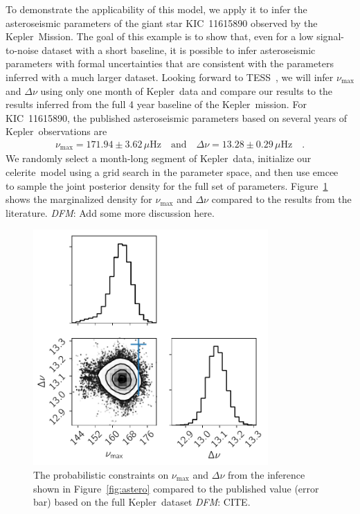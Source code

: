 \documentclass[manuscript, letterpaper]{aastex6}
\newcommand{\project}[1]{\textsf{#1}}
\newcommand{\kepler}{\project{Kepler}}
\newcommand{\tess}{\project{TESS}}
\newcommand{\celerite}{\project{celerite}}
\newcommand{\emcee}{\project{emcee}}
\newcommand{\figureref}[1]{\ref{fig:#1}}
\newcommand{\Figure}[1]{Figure~\figureref{#1}}
\newcommand{\figurelabel}[1]{\label{fig:#1}}
\newcommand{\todo}[3]{{\color{#2}\emph{#1}: #3}}
\newcommand{\dfmtodo}[1]{\todo{DFM}{red}{#1}}
\begin{document}
To demonstrate the applicability of this model, we apply it to infer the
asteroseismic parameters of the giant star KIC~11615890 observed by the
\kepler\ Mission.
The goal of this example is to show that, even for a low signal-to-noise
dataset with a short baseline, it is possible to infer asteroseismic
parameters with formal uncertainties that are consistent with the parameters
inferred with a much larger dataset.
Looking forward to \tess\ \citep{Ricker:2014,Campante:2016}, we will infer
$\nu_\mathrm{max}$ and $\Delta\nu$ using only one month of \kepler\ data and
compare our results to the results inferred from the full 4 year baseline of
the \kepler\ mission.
For KIC~11615890, the published asteroseismic parameters based on several
years of \kepler\ observations are \citep{Pinsonneault:2014}
\begin{eqnarray}
    \nu_\mathrm{max} = 171.94 \pm 3.62 \,\mu\mathrm{Hz} \quad\mathrm{and}\quad
    \Delta\nu = 13.28 \pm 0.29 \,\mu\mathrm{Hz} \quad.
\end{eqnarray}
We randomly select a month-long segment of \kepler\ data, initialize our
\celerite\ model using a grid search in the parameter space, and then use
\emcee\ \citep{Foreman-Mackey:2013} to sample the joint posterior density for
the full set of parameters.
\Figure{astero-corner} shows the marginalized density for $\nu_\mathrm{max}$
and $\Delta\nu$ compared to the results from the literature.
\dfmtodo{Add some more discussion here.}

\begin{figure}[!htbp]
\begin{center}
\includegraphics[width=0.8\textwidth]{figures/astero-11615890-numax_deltanu_corner.pdf}
\caption{The probabilistic constraints on $\nu_\mathrm{max}$ and $\Delta \nu$
    from the inference shown in \Figure{astero} compared to the published
    value (error bar) based on the full \kepler\ dataset \dfmtodo{CITE}.
    \figurelabel{astero-corner}}
\end{center}
\end{figure}
\end{document}
